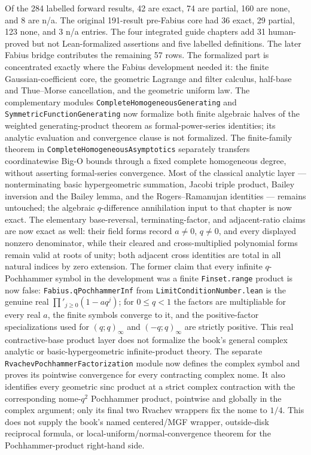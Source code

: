 \documentclass[11pt,a4paper,oneside,openany]{book}
\theoremstyle{definition}
\theoremstyle{remark}
\newcommand{\statusexact}{\textsf{\color{statusgreen}exact}}
\newcommand{\statuspartial}{\textsf{\color{statusamber}partial}}
\newcommand{\statusnone}{\textsf{\color{statusred}none}}
\newcommand{\statusna}{\textsf{n/a}}
\begin{document}
Of the 284 labelled forward results, 42 are \statusexact, 74 are
\statuspartial, 160 are \statusnone, and 8 are \statusna.  The original
191-result pre-Fabius core had 36 \statusexact, 29 \statuspartial, 123
\statusnone, and 3 \statusna{} entries.  The four integrated guide chapters
add 31 human-proved but not Lean-formalized assertions and five labelled
definitions.  The later Fabius bridge contributes the remaining 57 rows.
The formalized part is concentrated exactly where the Fabius development
needed it: the finite Gaussian-coefficient core, the geometric Lagrange and
filter calculus, half-base and Thue--Morse cancellation, and the geometric
uniform law.  The complementary modules
\texttt{CompleteHomogeneousGenerating} and
\texttt{SymmetricFunctionGenerating} now formalize both finite algebraic
halves of the weighted generating-product theorem as formal-power-series
identities; its analytic evaluation and convergence clause is not
formalized.  The finite-family theorem in
\texttt{CompleteHomogeneousAsymptotics} separately transfers coordinatewise
Big-O bounds through a fixed complete homogeneous degree, without asserting
formal-series convergence.  Most of the classical analytic layer --- nonterminating basic
hypergeometric summation, Jacobi triple product, Bailey inversion and the
Bailey lemma, and the Rogers--Ramanujan identities --- remains untouched;
the algebraic \(q\)-difference annihilation input to that chapter is now
exact.  The elementary base-reversal, terminating-factor, and adjacent-ratio
claims are now exact as well: their field forms record \(a\ne0\), \(q\ne0\),
and every displayed nonzero denominator, while their cleared and
cross-multiplied polynomial forms remain valid at roots of unity; both
adjacent cross identities are total in all natural indices by zero extension.
The former
claim that every infinite \(q\)-Pochhammer symbol in
the development was a finite \texttt{Finset.range} product is now false:
\texttt{Fabius.qPochhammerInf} from \texttt{LimitConditionNumber.lean} is the genuine real
\(\prod'_{j\ge0}(1-aq^j)\); for \(0\le q<1\) the factors are multipliable for
every real \(a\), the finite symbols converge to it, and the positive-factor
specializations used for \((q;q)_\infty\) and \((-q;q)_\infty\) are strictly
positive.  This real contractive-base product layer does not formalize the
book's general complex analytic or basic-hypergeometric infinite-product
theory.  The separate \texttt{RvachevPochhammerFactorization} module now
defines the complex symbol and proves its pointwise convergence for every
contracting complex nome.  It also identifies every geometric sinc product
at a strict complex contraction with the corresponding nome-\(q^2\)
Pochhammer product, pointwise and globally in the complex argument; only its
final two Rvachev wrappers fix the nome to \(1/4\).  This does not supply the
book's named centered/MGF wrapper, outside-disk reciprocal formula, or
local-uniform/normal-convergence theorem for the Pochhammer-product
right-hand side.
\end{document}
